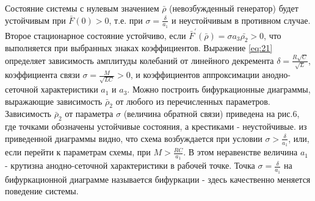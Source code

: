 Состояние системы с нулевым значением $\bar{\rho}$ (невозбужденный генератор) будет устойчивым при $\bar{F}(0)>0$, т.е. при $\sigma=\frac{\delta}{a_1}$ и неустойчивым в противном случае. Второе стационарное состояние устойчиво, если $\bar{F}^{'}(\bar{\rho})=\sigma a_3 \bar{\rho_2}>0$, что выполняется при выбранных знаках коэффициентов. Выражение \eqref{eq:21} определяет зависимость амплитуды колебаний от линейного декремента $\delta=\frac{R\sqrt{C}}{\sqrt{L}}$, коэффициента связи $\sigma=\frac{M}{\sqrt{LC}}>0$, и коэффициентов аппроксимации анодно-сеточной характеристики $a_1$ и $a_3$. Можно построить бифуркационные диаграммы, выражающие зависимость $\bar{\rho}_2$ от любого из перечисленных параметров. Зависимость $\bar{\rho}_2$ от параметра $\sigma$ (величина обратной связи) приведена на рис.6, где точками обозначены устойчивые состояния, а крестиками - неустойчивые. из приведенной диаграммы видно, что схема возбуждается при условии $\sigma>\frac{\delta}{a_1}$, или, если перейти к параметрам схемы, при $M>\frac{RC}{a_1}$. В этом неравенстве величина $a_1$ - крутизна анодно-сеточной характеристики в рабочей точке. Точка $\sigma=\frac{\delta}{a_1}$ на бифуркационной диаграмме называется { бифуркации} - здесь качественно меняется поведение системы.

